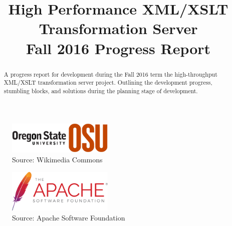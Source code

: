 

\title{
	High Performance XML/XSLT Transformation Server \\
    {
    	\LARGE Fall 2016 Progress Report 
    }
}
\author{
}



\maketitle
\begin{abstract}
  A progress report for development during the Fall 2016 term the high-throughput XML/XSLT transformation server project.
  Outlining the development progress, stumbling blocks, and solutions during the planning stage of development.
\end{abstract}

\begin{figure}[h]
  \begin{centering}
    \includegraphics[width=0.45\textwidth]{figures/osu-logo}
    \caption{Source: Wikimedia Commons \cite{osu-logo}}
  \end{centering}
\end{figure}

\begin{figure}[h]
  \begin{centering}
    \includegraphics[width=0.45\textwidth]{figures/asf-logo}
    \caption{Source: Apache Software Foundation \cite{asf-logo}}
  \end{centering}
\end{figure}

\clearpage

